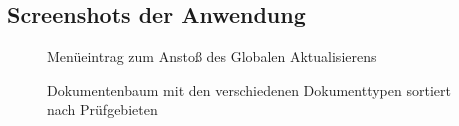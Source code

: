 \subsection{Screenshots der Anwendung}
\label{app:Screenshots}

\begin{figure}[htb]
\centering
{}
\caption{Menüeintrag zum Anstoß des Globalen Aktualisierens}
\end{figure}

\begin{figure}[htb]
\centering
{}
\caption{Dokumentenbaum mit den verschiedenen Dokumenttypen sortiert nach Prüfgebieten}
\end{figure}
